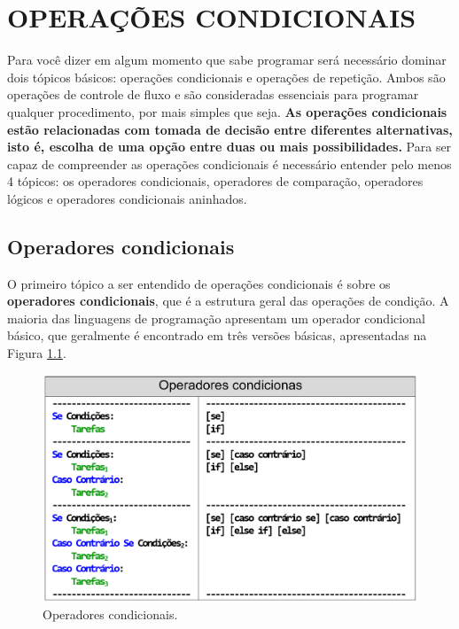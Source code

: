 \documentclass[
  11pt,
  a5paper,
  openany]{book}
\begin{document}
\hypertarget{operauxe7uxf5es-condicionais}{%
\chapter{OPERAÇÕES CONDICIONAIS}\label{operauxe7uxf5es-condicionais}}

Para você dizer em algum momento que sabe programar será necessário dominar dois tópicos básicos: operações condicionais e operações de repetição. Ambos são operações de controle de fluxo e são consideradas essenciais para programar qualquer procedimento, por mais simples que seja.
\textbf{As operações condicionais estão relacionadas com tomada de decisão entre diferentes alternativas, isto é, escolha de uma opção entre duas ou mais possibilidades.} Para ser capaz de compreender as operações condicionais é necessário entender pelo menos 4 tópicos: os operadores condicionais, operadores de comparação, operadores lógicos e operadores condicionais aninhados.

\hypertarget{operadores-condicionais}{%
\section{Operadores condicionais}\label{operadores-condicionais}}

O primeiro tópico a ser entendido de operações condicionais é sobre os \textbf{operadores condicionais}, que é a estrutura geral das operações de condição. A maioria das linguagens de programação apresentam um operador condicional básico, que geralmente é encontrado em três versões básicas, apresentadas na Figura \ref{fig:FigCond1}.

\begin{figure}

{\centering \includegraphics[width=1\linewidth]{images/Fig_Cond1} 

}

\caption{Operadores condicionais.}\label{fig:FigCond1}
\end{figure}
\end{document}
